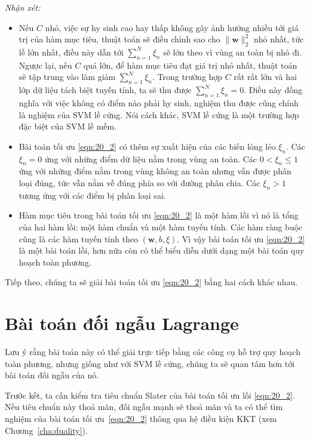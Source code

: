  
\textit{Nhận xét:} 
\begin{itemize}
    \item Nếu $C$ nhỏ, việc {sự hy sinh} cao hay thấp không gây ảnh hưởng
    nhiều tới giá trị của hàm mục tiêu, thuật toán sẽ điều chỉnh sao cho
    $\|\mathbf{w}\|_2^2$ nhỏ nhất, tức lề lớn nhất, điều này
    dẫn tới $\sum_{n=1}^N\xi_n$ sẽ lớn theo vì vùng an toàn bị nhỏ đi. Ngược
    lại, nếu $C$ quá lớn, để hàm mục tiêu đạt giá trị nhỏ nhất, thuật toán sẽ
    tập trung vào làm giảm $\sum_{n=1}^N\xi_n$. Trong trường hợp $C$ rất rất lớn
    và hai lớp dữ liệu tách biệt tuyến tính, ta sẽ thu được $\sum_{n=1}^N\xi_n
    = 0$. Điều này đồng nghĩa với
    việc không có điểm nào phải {hy sinh}, nghiệm thu được cũng chính là nghiệm của SVM lề cứng. Nói cách khác, SVM lề cứng là
    một trường hợp đặc biệt của SVM lề mềm.
     
    \item Bài toán tối ưu \eqref{eqn:20_2} có thêm sự xuất hiện của các
    biến lỏng lẻo $\xi_n$. Các $\xi_n = 0$ ứng với những
    điểm dữ liệu nằm trong {vùng an toàn}. Các $0 < \xi_n \leq 1$ ứng với những điểm nằm trong {vùng không an toàn} nhưng vẫn được phân
    loại
    đúng, tức vẫn nằm về đúng phía so với đường phân chia. Các $\xi_n > 1$
    tương ứng với các điểm bị phân loại sai.
     
    \item Hàm mục tiêu trong bài toán tối ưu \eqref{eqn:20_2} là một hàm lồi vì nó là tổng của hai hàm lồi: một hàm chuẩn và một hàm tuyến tính. Các hàm ràng buộc cũng là các hàm tuyến tính theo $(\mathbf{w}, b, \xi)$. Vì vậy bài toán tối ưu \eqref{eqn:20_2} là một bài toán lồi, hơn nữa còn có thể biểu diễn dưới dạng một bài toán quy hoạch toàn phương.  
\end{itemize}
 
Tiếp theo, chúng ta sẽ giải bài toán tối ưu \eqref{eqn:20_2} bằng hai
cách khác nhau. 
 
\section{Bài toán đối ngẫu Lagrange }
Lưu ý rằng bài toán này có thể giải trực tiếp bằng các công cụ hỗ trợ quy hoạch toàn phương, nhưng
giống như với SVM lề cứng, chúng ta sẽ quan tâm hơn tới bài toán đối ngẫu của nó. 
 
Trước kết, ta cần kiểm tra tiêu chuẩn Slater của bài toán tối ưu lồi
\eqref{eqn:20_2}. Nếu tiêu chuẩn này thoả mãn, đối ngẫu mạnh sẽ
thoả mãn và ta có thể tìm nghiệm của bài toán tối ưu~\eqref{eqn:20_2} thông qua
hệ điều kiện KKT (xem Chương~\ref{cha:duality}). 
 

